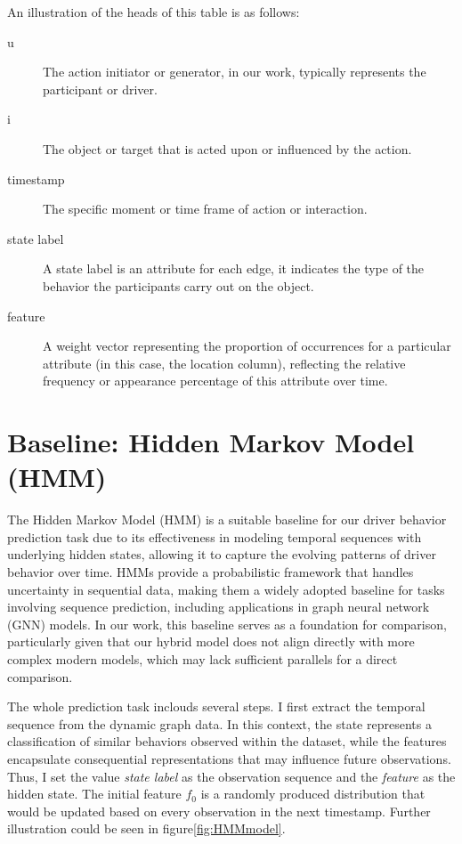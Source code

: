 An illustration of the heads of this table is as follows:

\begin{description}
    \item[u] The action initiator or generator, in our work, typically represents the participant or driver.
    \item[i] The object or target that is acted upon or influenced by the action.
    \item[timestamp] The specific moment or time frame of action or interaction.
    \item[state label] A state label is an attribute for each edge, it indicates the type of the behavior the participants carry out on the object.
    \item[feature] A weight vector representing the proportion of occurrences for a particular attribute (in this case, the location column), reflecting the relative frequency or appearance percentage of this attribute over time.
\end{description}


\clearpage
\section{Baseline: Hidden Markov Model (HMM)}


The Hidden Markov Model (HMM) is a suitable baseline for our driver behavior prediction task due to its effectiveness in modeling temporal sequences with underlying hidden states, allowing it to capture the evolving patterns of driver behavior over time. HMMs provide a probabilistic framework that handles uncertainty in sequential data, making them a widely adopted baseline for tasks involving sequence prediction, including applications in graph neural network (GNN) models. In our work, this baseline serves as a foundation for comparison, particularly given that our hybrid model does not align directly with more complex modern models, which may lack sufficient parallels for a direct comparison.

The whole prediction task inclouds several steps. I first extract the temporal sequence from the dynamic graph data. In this context, the state represents a classification of similar behaviors observed within the dataset, while the features encapsulate consequential representations that may influence future observations. Thus, I set the value \textit{state label} as the observation sequence and the \textit{feature} as the hidden state. The initial feature $f_0$ is a randomly produced distribution that would be updated based on every observation in the next timestamp. Further illustration could be seen in figure\ref{fig:HMMmodel}. 

